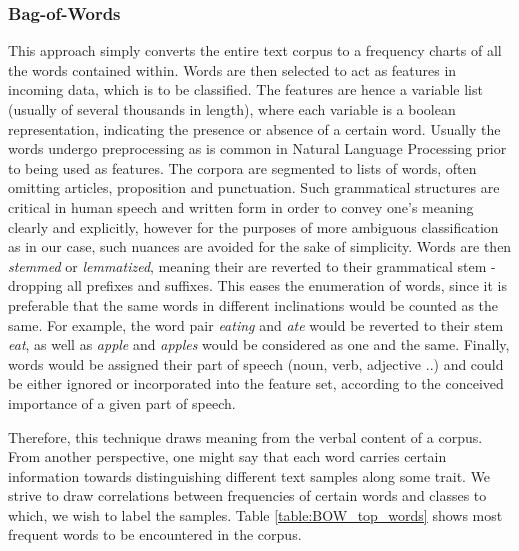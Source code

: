		\subsubsection{Bag-of-Words}
			This approach simply converts the entire text corpus to a frequency charts of all the words contained within. Words are then selected to act as features in incoming data, which is to be classified. The features are hence a variable list (usually of several thousands in length), where each variable is a boolean representation, indicating the presence or absence of a certain word. Usually the words undergo preprocessing as is common in Natural Language Processing prior to being used as features. The corpora are segmented to lists of words, often omitting articles, proposition and punctuation. Such grammatical structures are critical in human speech and written form in order to convey one's meaning clearly and explicitly, however for the purposes of more ambiguous classification as in our case, such nuances are avoided for the sake of simplicity. Words are then \textit{stemmed} or \textit{lemmatized}, meaning their are reverted to their grammatical stem - dropping all prefixes and suffixes. This eases the enumeration of words, since it is preferable that the same words in different inclinations would be counted as the same. For example, the word pair \textit{eating} and \textit{ate} would be reverted to their stem \textit{eat}, as well as \textit{apple} and \textit{apples} would be considered as one and the same. Finally, words would be assigned their part of speech (noun, verb, adjective ..) and could be either ignored or incorporated into the feature set, according to the conceived importance of a given part of speech.
		
			Therefore, this technique draws meaning from the verbal content of a corpus. From another perspective, one might say that each word carries certain information towards distinguishing different text samples along some trait. We strive to draw correlations between frequencies of certain words and classes to which, we wish to label the samples. Table \ref{table:BOW_top_words} shows most frequent words to be encountered in the corpus. 
			
